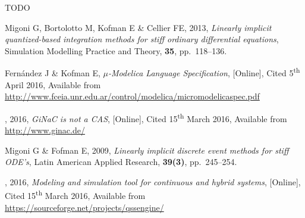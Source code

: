 \documentclass[10pt]{article}
\begin{document}
TODO


{\footnotesize
\begin{thebibliography}{10}

 {\sc Migoni G, Bortolotto M, Kofman E \& Cellier FE}, 2013, {\em Linearly implicit quantized-based integration methods for stiff ordinary differential equations}, Simulation Modelling Practice and Theory, {\bf{35}}, pp.\, 118--136.

 {\sc Fern\'andez J \& Kofman E}, {\em $\mu$-Modelica Language Specification}, [Online], Cited 5\textsuperscript{th} April 2016, Available from {\url{http://www.fceia.unr.edu.ar/control/modelica/micromodelicaspec.pdf}}

, 2016, {\em GiNaC is not a CAS}, [Online], Cited 15\textsuperscript{th} March 2016, Available from {\url{http://www.ginac.de/}}


 {\sc Migoni G \& Fofman E}, 2009, {\em Linearly implicit discrete event methods for stiff ODE's}, Latin American Applied Research, {\bf{39(3)}}, pp.\, 245--254.


, 2016, {\em Modeling and simulation tool for continuous and hybrid systems}, [Online], Cited 15\textsuperscript{th} March 2016, Available from {\url{https://sourceforge.net/projects/qssengine/}}



\end{thebibliography}}
\end{document}
